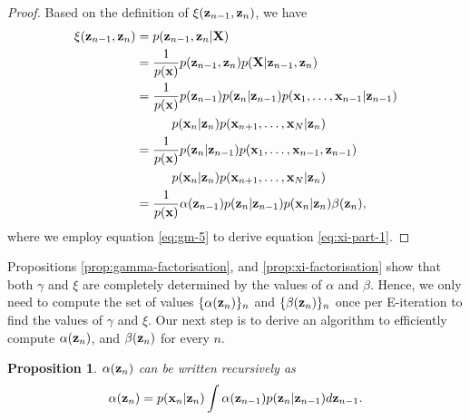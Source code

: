 \documentclass[12pt, oneside]{book}
\numberwithin{equation}{section}
\newcommand{\x}{{\bf x}}
\newcommand{\X}{{\bf X}}
\newcommand{\z}{{\bf z}}
\newtheorem{proposition}{Proposition}[section]
\begin{document}
{\begin{proof}
	Based on the definition of $\xi(\z_{n-1}, \z_{n})$, we have
	\begin{align}
		\xi(\z_{n-1}, \z_{n}) &= p(\z_{n-1}, \z_{n} \vert \X)\\
		&= \frac{1}{p(\x)}p(\z_{n-1}, \z_{n}) p(\X \vert \z_{n-1}, \z_{n})\\
		&= \frac{1}{p(\x)} p(\z_{n-1}) p(\z_{n} \vert \z_{n-1}) p(\x_1, \ldots, \x_{n-1}\vert \z_{n-1}) \nonumber \\
			&\hspace{1cm} p(\x_n\vert \z_n) p(\x_{n+1}, \ldots, \x_N \vert \z_n) \label{eq:xi-part-1}\\
		&= \frac{1}{p(\x)} p(\z_{n} \vert \z_{n-1}) p(\x_1, \ldots, \x_{n-1}, \z_{n-1}) \nonumber \\
			&\hspace{1cm} p(\x_n\vert \z_n) p(\x_{n+1}, \ldots, \x_N \vert \z_n)\\
		&= \frac{1}{p(\x)} \alpha(\z_{n-1}) p(\z_{n} \vert \z_{n-1}) p(\x_n \vert \z_n) \beta(\z_n),
	\end{align}
where we employ equation \eqref{eq:gm-5} to derive equation \eqref{eq:xi-part-1}.
\end{proof}


Propositions \ref{prop:gamma-factorisation}, and \ref{prop:xi-factorisation} show that both $\gamma$ and $\xi$ are completely determined by the values of $\alpha$ and $\beta$. Hence, we only need to compute the set of values $\{\alpha(\z_n)\}_n$ and $\{\beta(\z_n)\}_n$ once per E-iteration to find the values of $\gamma$ and $\xi$. Our next step is to derive an algorithm to efficiently compute $\alpha(\z_n)$, and $\beta(\z_n)$ for every $n$.


\begin{proposition} \label{prop:alpha-recursive}
	$\alpha(\z_n)$ can be written recursively as
	\begin{equation}
		\alpha(\z_n) = p(\x_n\vert \z_n) \int \alpha(\z_{n-1})p(\z_n\vert\z_{n-1}) d\z_{n-1}.
	\end{equation}
\end{proposition}

}
\end{document}
